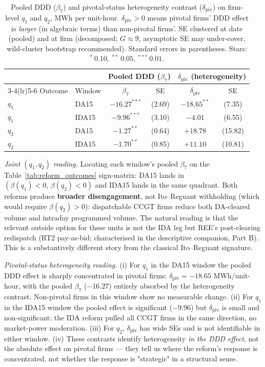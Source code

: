 \documentclass[11pt,a4paper]{article}
\begin{document}
\begin{table}[H]
\centering\footnotesize
\setlength{\tabcolsep}{4pt}
\caption{Pooled DDD ($\beta_7$) and pivotal-status heterogeneity contrast ($\delta_{\text{piv}}$) on firm-level $q_1$ and $q_2$, MWh per unit-hour. $\delta_{\text{piv}} > 0$ means pivotal firms' DDD effect is \emph{larger} (in algebraic terms) than non-pivotal firms'. SE clustered at date (pooled) and at firm (decomposed; $G \approx 9$, asymptotic SE may under-cover, wild-cluster bootstrap recommended). Standard errors in parentheses. Stars: $^{*}~0.10,~^{**}~0.05,~^{***}~0.01$.}
\label{tab:reform_firm_summary}
\begin{tabular}{llcc|cc}
\toprule
& & \multicolumn{2}{c}{Pooled DDD ($\beta_7$)} & \multicolumn{2}{c}{$\delta_{\text{piv}}$ (heterogeneity)} \\
\cmidrule(lr){3-4}\cmidrule(lr){5-6}
Outcome & Window & $\beta_7$ & SE & $\delta_{\text{piv}}$ & SE \\
\midrule
$q_1$ & DA15  & $-16.27^{***}$ & (2.69) & $-18.65^{**}$  & (7.35) \\
$q_1$ & IDA15 & $-9.96^{***}$  & (3.10) & $-4.01$        & (6.55) \\
$q_2$ & DA15  & $-1.27^{**}$   & (0.64) & $+18.78$       & (15.82) \\
$q_2$ & IDA15 & $-1.70^{**}$   & (0.85) & $+11.10$       & (10.81) \\
\bottomrule
\end{tabular}
\end{table}

\textit{Joint $(q_1, q_2)$ reading.}
Locating each window's pooled $\beta_7$ on the Table~\ref{tab:reform_outcomes} sign-matrix: DA15 lands in $(\beta(q_1) < 0,\,\beta(q_2) < 0)$ and IDA15 lands in the same quadrant. Both reforms produce \textbf{broader disengagement}, not Ito--Reguant withholding (which would require $\beta(q_2) > 0$): dispatchable CCGT firms reduce both DA-cleared volume and intraday programmed volume. The natural reading is that the relevant outside option for these units is not the IDA leg but REE's post-clearing redispatch (RT2 pay-as-bid; characterised in the descriptive companion, Part B). This is a substantively different story from the classical Ito--Reguant signature.

\textit{Pivotal-status heterogeneity reading.}
(i) For $q_1$ in the DA15 window the pooled DDD effect is sharply concentrated in pivotal firms: $\delta_{\text{piv}} = -18.65$ MWh/unit-hour, with the pooled $\beta_7$ ($-16.27$) entirely absorbed by the heterogeneity contrast. Non-pivotal firms in this window show no measurable change. (ii) For $q_1$ in the IDA15 window the pooled effect is significant ($-9.96$) but $\delta_{\text{piv}}$ is small and non-significant: the IDA reform pulled all CCGT firms in the same direction, no market-power moderation. (iii) For $q_2$, $\delta_{\text{piv}}$ has wide SEs and is not identifiable in either window. (iv) These contrasts identify heterogeneity \emph{in the DDD effect}, not the absolute effect on pivotal firms --- they tell us where the reform's response is concentrated, not whether the response is "strategic" in a structural sense.
\end{document}
